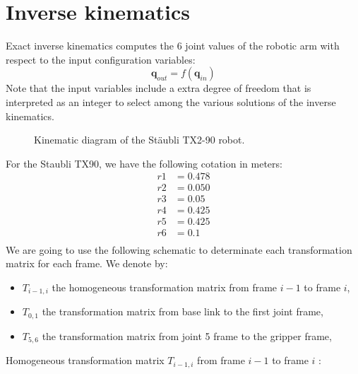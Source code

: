\documentclass{article}
\newcommand\conf{\mathbf{q}}
\begin{document}
\section{Inverse kinematics}

Exact inverse kinematics computes the 6 joint values of the robotic arm with
respect to the input configuration variables:
\begin{equation}\label{eq:inverse-kinematics}
  \conf_{out} = f(\conf_{in})
\end{equation}
Note that the input variables include a extra degree of freedom that is interpreted as an integer to select among the various solutions of the inverse kinematics.

\begin{figure}[h]
  \center
  \graphicspath{{./figures/}}
  
  \caption{Kinematic diagram of the Stäubli TX2-90 robot.}
\end{figure}
For the Staubli TX90, we have the following cotation in meters:
\begin{align*}
  r1&=0.478\\
  r2&=0.050\\
  r3&=0.05\\
  r4&=0.425\\
  r5&=0.425\\
  r6&=0.1\\
\end{align*}
We are going to use the following schematic to determinate each transformation matrix for each frame.
We denote by:
\begin{itemize}
\item $T_{i-1,i}$ the homogeneous transformation matrix from frame $i-1$ to frame $i$,\\
\item $T_{0,1}$ the transformation matrix from base link to the first joint frame,\\
\item $T_{5,6}$ the transformation matrix from joint 5 frame to the gripper frame,\\
\end{itemize}
Homogeneous transformation matrix  $T_{i-1,i}$  from frame $i-1$  to frame $i$  :
\end{document}
